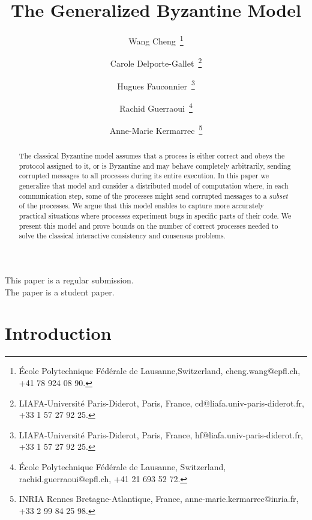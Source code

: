 \documentclass[11pt]{article}
\newcommand{\tmem}[1]{{\em #1\/}}
\begin{document}
\title{The Generalized Byzantine Model}

\author{
    Wang Cheng~\protect\footnote{\'{E}cole Polytechnique F\'{e}d\'{e}rale de Lausanne,Switzerland, cheng.wang@epfl.ch, +41 78 924 08 90.}
    \and
    Carole Delporte-Gallet~\protect\footnote{LIAFA-Universit\'{e} Paris-Diderot, Paris, France, cd@liafa.univ-paris-diderot.fr, +33 1 57 27 92 25.}
    \and
    Hugues Fauconnier~\protect\footnote{LIAFA-Universit\'{e} Paris-Diderot, Paris, France, hf@liafa.univ-paris-diderot.fr, +33 1 57 27 92 25.}
    \and
    Rachid Guerraoui~\protect\footnote{\'{E}cole Polytechnique F\'{e}d\'{e}rale de Lausanne, Switzerland, rachid.guerraoui@epfl.ch, +41 21 693 52 72.}
    \and
    Anne-Marie Kermarrec~\protect\footnote{INRIA Rennes Bretagne-Atlantique, France, anne-marie.kermarrec@inria.fr, +33 2 99 84 25 98.}
}

\maketitle

\begin{abstract}

The classical Byzantine model assumes that a process is either correct and obeys the protocol assigned to it, or is Byzantine and may  behave completely arbitrarily, sending corrupted messages to all processes during its entire execution. In this paper we generalize that model and consider a distributed model of computation where, in each communication step, some of the processes might send corrupted messages to a \tmem{subset} of the processes. We argue that this model enables to capture more accurately  practical situations where processes experiment bugs in specific parts of their code. We present this model and prove bounds on the number of correct processes needed to solve the classical interactive consistency and consensus problems.

\end{abstract}

\vspace{4cm}
\begin{center}
\Large This paper is a regular submission.\\
\Large The paper is a student paper.
\end{center}

\newpage
{}\setcounter{page}{1}

\section{Introduction}
\end{document}
